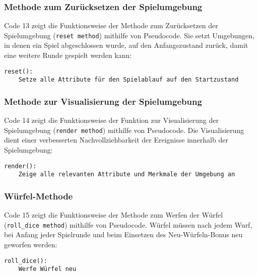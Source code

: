 \subsubsection{Methode zum Zurücksetzen der Spielumgebung}
\begin{minipage}{\linewidth}
Code 13 zeigt die Funktionsweise der Methode zum Zurücksetzen der Spielumgebung (\texttt{reset method}) mithilfe von Pseudocode. Sie setzt Umgebungen, in denen ein Spiel abgeschlossen wurde, auf den Anfangszustand zurück, damit eine weitere Runde gespielt werden kann:
\vspace{0.5cm}
\begin{lstlisting}[caption={Methode zum Zurücksetzen der Umgebung}]
reset():
	Setze alle Attribute für den Spielablauf auf den Startzustand
\end{lstlisting}
\end{minipage}

\subsubsection{Methode zur Visualisierung der Spielumgebung}
\begin{minipage}{\linewidth}
Code 14 zeigt die Funktionsweise der Funktion zur Visualisierung der Spielumgebung (\texttt{render method}) mithilfe von Pseudocode. Die Visualisierung dient einer verbesserten Nachvollziehbarkeit der Ereignisse innerhalb der Spielumgebung:
\vspace{0.5cm}
\begin{lstlisting}[caption={Methode zur Visualisierung der Spielumgebung}]
render():
	Zeige alle relevanten Attribute und Merkmale der Umgebung an
\end{lstlisting}
\end{minipage}

\subsubsection{Würfel-Methode}
\begin{minipage}{\linewidth}
Code 15 zeigt die Funktionsweise der Methode zum Werfen der Würfel (\texttt{roll\_dice method}) mithilfe von Pseudocode. Würfel müssen nach jedem Wurf, bei Anfang jeder Spielrunde und beim Einsetzen des Neu-Würfeln-Bonus neu geworfen werden:
\vspace{0.5cm}
\begin{lstlisting}[caption={Methode zum Werfen der Würfel}]
roll_dice():
	Werfe Würfel neu
\end{lstlisting}
\end{minipage}

